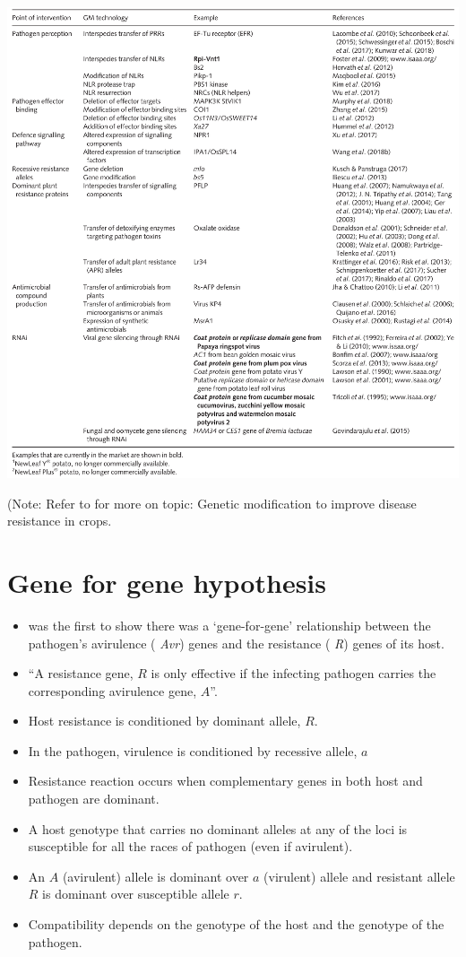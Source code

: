 \documentclass[11pt,dvipsnames,ignorenonframetext,aspectratio=169]{beamer}
\providecommand{\tightlist}{%
  \setlength{\itemsep}{0pt}\setlength{\parskip}{0pt}}
\begin{document}
\begin{frame}{}
\protect\hypertarget{section-5}{}
\begin{center}\includegraphics[width=0.4\linewidth]{../images/genetic_solution_pathogens} \end{center}

\tiny (Note: Refer to \citep{van2020genetic} for more on topic: Genetic
modification to improve disease resistance in crops.
\end{frame}

\hypertarget{gene-for-gene-hypothesis}{%
\section{Gene for gene hypothesis}\label{gene-for-gene-hypothesis}}

\begin{frame}{}
\protect\hypertarget{section-6}{}
\begin{itemize}
\tightlist
\item
  \citet{flor1956complementary} was the first to show there was a
  `gene-for-gene' relationship between the pathogen's avirulence (
  \emph{Avr}) genes and the resistance ( \emph{R}) genes of its host.
\item
  ``A resistance gene, \(R\) is only effective if the infecting pathogen
  carries the corresponding avirulence gene, \(A\)''.
\item
  Host resistance is conditioned by dominant allele, \(R\).
\item
  In the pathogen, virulence is conditioned by recessive allele, \(a\)
\item
  Resistance reaction occurs when complementary genes in both host and
  pathogen are dominant.
\item
  A host genotype that carries no dominant alleles at any of the loci is
  susceptible for all the races of pathogen (even if avirulent).
\item
  An \(A\) (avirulent) allele is dominant over \(a\) (virulent) allele
  and resistant allele \(R\) is dominant over susceptible allele \(r\).
\item
  Compatibility depends on the genotype of the host and the genotype of
  the pathogen.
\end{itemize}
\end{frame}
\end{document}
